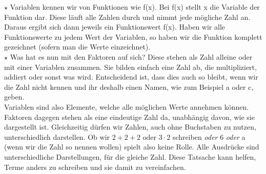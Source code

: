 	\(\star\) Variablen kennen wir von Funktionen wie f(x). Bei f(x) stellt x die
	Variable der Funktion dar. Diese läuft alle Zahlen durch und nimmt jede
	mögliche Zahl an. Daraus ergibt sich dann jeweils ein Funktionswert f(x). Haben
	wir alle Funktionswerte zu jedem Wert der Variablen, so haben wir die Funktion
	komplett gezeichnet (sofern man die Werte einzeichnet). \\
	
	\(\star\) Was hat es nun mit den Faktoren auf sich? Diese stehen als Zahl
	alleine oder mit einer Variablen zusammen. Sie bilden einfach eine Zahl ab, die
	multipliziert, addiert oder sonst was wird. Entscheidend ist, dass dies auch so
	bleibt, wenn wir die Zahl nicht kennen und ihr deshalb einen Namen, wie zum
	Beispiel a oder c, geben.\\
	Variablen sind also Elemente, welche alle möglichen Werte annehmen können.
	Faktoren dagegen stehen als eine eindeutige Zahl da, unabhängig davon, wie sie
	dargestellt ist.
	Gleichzeitig dürfen wir Zahlen, auch ohne Buchstaben zu nutzen, unterschiedlich
	darstellen. Ob wir \(2+2+2\text{ oder }3\cdot 2\) schreiben \textit{oder} 6
	\textit{oder} a (wenn wir die Zahl so nennen wollen) spielt also keine Rolle.
	Alle Ausdrücke sind unterschiedliche Darstellungen, für die gleiche Zahl. Diese
	Tatsache kann helfen, Terme anders zu schreiben und sie damit zu
	vereinfachen.

